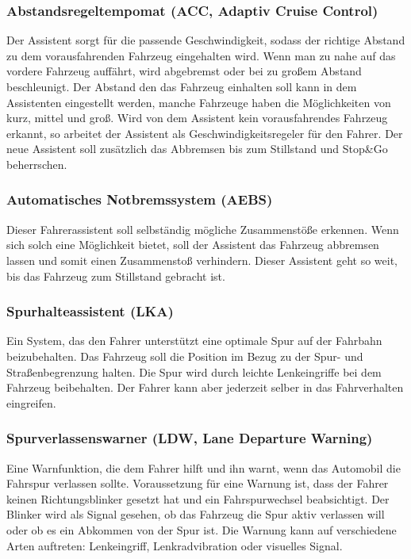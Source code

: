         \subsubsection{Abstandsregeltempomat (ACC, Adaptiv Cruise Control)}
        Der Assistent sorgt für die passende Geschwindigkeit, sodass der richtige Abstand
        zu dem vorausfahrenden Fahrzeug eingehalten wird. Wenn man zu nahe auf das vordere
        Fahrzeug auffährt, wird abgebremst oder bei zu großem Abstand beschleunigt. Der Abstand
        den das Fahrzeug einhalten soll kann in dem Assistenten eingestellt werden, manche Fahrzeuge
        haben die Möglichkeiten von kurz, mittel und groß. Wird von dem Assistent kein vorausfahrendes
        Fahrzeug erkannt, so arbeitet der Assistent als Geschwindigkeitsregeler für den Fahrer. Der
        neue Assistent soll zusätzlich das Abbremsen bis zum Stillstand und Stop\&Go beherrschen.
        \cite{assistenzsysteme.PB2} \cite{Audi.PB1}

        \subsubsection{Automatisches Notbremssystem (AEBS)}
        Dieser Fahrerassistent soll selbständig mögliche Zusammenstöße erkennen. Wenn sich solch
        eine Möglichkeit bietet, soll der Assistent das Fahrzeug abbremsen lassen und somit einen
        Zusammenstoß verhindern. Dieser Assistent geht so weit, bis das Fahrzeug zum Stillstand 
        gebracht ist.
        \cite{notbremsassi.PB1} \cite{assistenzsysteme.PB1}  \cite{assistenzsysteme.PB2}
        \cite{notbremsassi.PB2}
        
        \subsubsection{Spurhalteassistent (LKA)}
        Ein System, das den Fahrer unterstützt eine optimale Spur auf der Fahrbahn beizubehalten.
        Das Fahrzeug soll die Position im Bezug zu der Spur- und Straßenbegrenzung halten. Die
        Spur wird durch leichte Lenkeingriffe bei dem Fahrzeug beibehalten. Der Fahrer kann aber
        jederzeit selber in das Fahrverhalten eingreifen.
        \cite{spurhalte.PB1} \cite{assistenzsysteme.PB1} \cite{spurhalte.PB2}  \cite{assistenzsysteme.PB2}

        \subsubsection{Spurverlassenswarner (LDW, Lane Departure Warning)}
        Eine Warnfunktion, die dem Fahrer hilft und ihn warnt, wenn das Automobil die Fahrspur
        verlassen sollte. Voraussetzung für eine Warnung ist, dass der Fahrer keinen Richtungsblinker
        gesetzt hat und ein Fahrspurwechsel beabsichtigt. Der Blinker wird als Signal gesehen, ob das 
        Fahrzeug die Spur aktiv verlassen will oder ob es ein Abkommen von der Spur ist. Die 
        Warnung kann auf verschiedene Arten auftreten: Lenkeingriff, Lenkradvibration oder visuelles
        Signal.
        \cite{assistenzsysteme.PB2} \cite{LDW.PB1}

